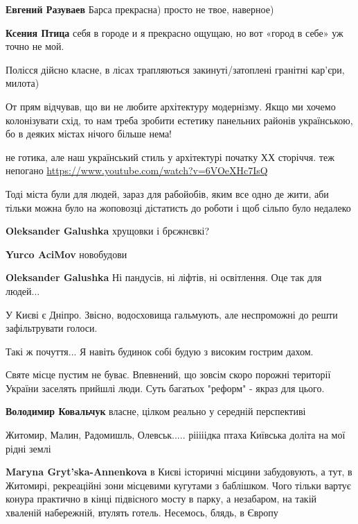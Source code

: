 \begin{itemize}
\begin{itemize}
\textbf{Евгений Разуваев} Барса прекрасна) просто не твое, наверное)

\textbf{Ксения Птица} себя в городе и я прекрасно ощущаю, но вот «город в себе» уж точно не мой.
\end{itemize} %

Полісся дійсно класне, в лісах трапляються закинуті/затоплені гранітні кар’єри, милота)

От прям відчував, що ви не любите архітектуру модернізму. Якщо ми хочемо колонізувати схід, то нам треба зробити естетику панельних районів українською, бо в деяких містах нічого більше нема!

не готика, але наш український стиль у архітектурі початку ХХ сторіччя. теж непогано \url{https://www.youtube.com/watch?v=6VOeXHc7IsQ}

Тоді міста були для людей, зараз для рабойобів, яким все одно де жити, аби тільки можна було на жоповозці дістатисть до роботи і щоб сільпо було недалеко

\begin{itemize} %
\textbf{Oleksander Galushka} хрущовки і брєжнєвкі?

\textbf{Yurco AciMov} новобудови

\textbf{Oleksander Galushka} Ні пандусів, ні ліфтів, ні освітлення. Оце так для людей...
\end{itemize} %

У Києві є Дніпро. Звісно, водосховища гальмують, але неспроможні до решти зафільтрувати голоси.

Такі ж почуття... Я навіть будинок собі будую з високим гострим дахом.

Святе місце пустим не буває. Впевнений, що зовсім скоро порожні території
України заселять прийшлі люди. Суть багатьох "реформ" - якраз для цього.

\begin{itemize} %
\textbf{Володимир Ковальчук} власне, цілком реально у середній перспективі
\end{itemize} %

Житомир, Малин, Радомишль, Олевськ.....
рііііідка птаха Київська доліта на мої рідні землі

\begin{itemize} %
\textbf{Maryna Gryt'ska-Annenkova} в Києві історичні місцини забудовують, а тут, в Житомирі, рекреаційні зони місцевими кугутами з баблішком. Чого тільки вартує конура практично в кінці підвісного мосту в парку, а незабаром, на такій хваленій набережній, втулять готель. Несемось, блядь, в Європу
\end{itemize} %


\end{itemize}
